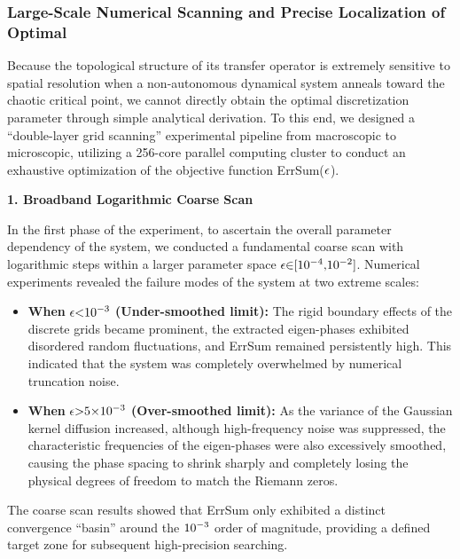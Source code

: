 \documentclass[fractalfract,article,submit,oneauthor,pdftex]{Definitions/mdpi}
\begin{document}
\subsubsection{Large-Scale Numerical Scanning and Precise Localization of Optimal}

Because the topological structure of its transfer operator is extremely
sensitive to spatial resolution when a non-autonomous dynamical system
anneals toward the chaotic critical point, we cannot directly obtain the
optimal discretization parameter through simple analytical derivation.
To this end, we designed a ``double-layer grid scanning'' experimental
pipeline from macroscopic to microscopic, utilizing a 256-core parallel
computing cluster to conduct an exhaustive optimization of the objective
function ErrSum(\(\text{\ensuremath{\epsilon}}\)).

\textbf{1. Broadband Logarithmic Coarse Scan}

In the first phase of the experiment, to ascertain the overall parameter
dependency of the system, we conducted a fundamental coarse scan with
logarithmic steps within a larger parameter space
\(\text{\ensuremath{\epsilon}\ensuremath{\in}[}\text{10}^{\text{\ensuremath{-}4}}\text{,}\text{10}^{\text{\ensuremath{-}2}}\text{]}\).
Numerical experiments revealed the failure modes of the system at two
extreme scales:

\begin{itemize}
\item
  \textbf{When} \(\text{\ensuremath{\epsilon}<}\text{10}^{\text{\ensuremath{-}3}}\)
  \textbf{(Under-smoothed limit):} The rigid boundary effects of the
  discrete grids became prominent, the extracted eigen-phases exhibited
  disordered random fluctuations, and ErrSum remained persistently high.
  This indicated that the system was completely overwhelmed by numerical
  truncation noise.
\item
  \textbf{When} \(\text{\ensuremath{\epsilon}>5\ensuremath{\times}}\text{10}^{\text{\ensuremath{-}3}}\)
  \textbf{(Over-smoothed limit):} As the variance of the Gaussian kernel
  diffusion increased, although high-frequency noise was suppressed, the
  characteristic frequencies of the eigen-phases were also excessively
  smoothed, causing the phase spacing to shrink sharply and completely
  losing the physical degrees of freedom to match the Riemann zeros.
\end{itemize}

The coarse scan results showed that ErrSum only exhibited a distinct
convergence ``basin'' around the \(\text{10}^{\text{\ensuremath{-}3}}\) order of
magnitude, providing a defined target zone for subsequent high-precision
searching.
\end{document}
